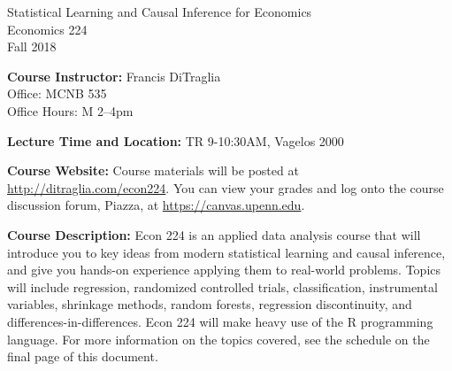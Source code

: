 \documentclass[11pt, letterpaper]{article}
\begin{document}
\thispagestyle{plain}

\begin{center}
\Large
\sc
Statistical Learning and Causal Inference for Economics\\
\large
Economics 224\\
\large
Fall 2018
\end{center}



\normalsize

\noindent \textbf{Course Instructor:} Francis DiTraglia \\
Office: MCNB 535\\
Office Hours: M 2--4pm 

\medskip


%
%
%
% 
\noindent \textbf{Lecture Time and Location:} TR 9-10:30AM, Vagelos 2000 



\medskip
 
\noindent \textbf{Course Website:} Course materials will be posted at \url{http://ditraglia.com/econ224}.
You can view your grades and log onto the course discussion forum, Piazza, at \url{https://canvas.upenn.edu}.

\medskip



\noindent \textbf{Course Description:} Econ 224 is an applied data analysis course that will introduce you to key ideas from modern statistical learning and causal inference, and give you hands-on experience applying them to real-world problems. 
Topics will include regression, randomized controlled trials, classification, instrumental variables, shrinkage methods, random forests, regression discontinuity, and differences-in-differences.
Econ 224 will make heavy use of the R programming language.
For more information on the topics covered, see the schedule on the final page of this document.

\medskip
\end{document}
